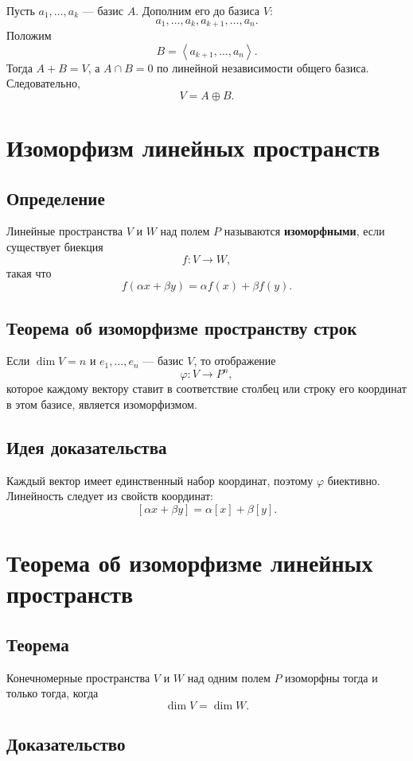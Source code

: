 \documentclass[12pt,a4paper]{article}
\newcommand{\Lin}[1]{\left\langle #1 \right\rangle}
\begin{document}
Пусть $a_1,\ldots,a_k$ --- базис $A$. Дополним его до базиса $V$:
\[
    a_1,\ldots,a_k,a_{k+1},\ldots,a_n.
\]
Положим
\[
    B=\Lin{a_{k+1},\ldots,a_n}.
\]
Тогда $A+B=V$, а $A\cap B=0$ по линейной независимости общего базиса. Следовательно,
\[
    V=A\oplus B.
\]

\section{Изоморфизм линейных пространств}

\subsection*{Определение}

Линейные пространства $V$ и $W$ над полем $P$ называются \textbf{изоморфными}, если существует биекция
\[
    f:V\to W,
\]
такая что
\[
    f(\alpha x+\beta y)=\alpha f(x)+\beta f(y).
\]

\subsection*{Теорема об изоморфизме пространству строк}

Если $\dim V=n$ и $e_1,\ldots,e_n$ --- базис $V$, то отображение
\[
    \varphi:V\to P^n,
\]
которое каждому вектору ставит в соответствие столбец или строку его координат в этом базисе, является изоморфизмом.

\subsection*{Идея доказательства}

Каждый вектор имеет единственный набор координат, поэтому $\varphi$ биективно. Линейность следует из свойств координат:
\[
    [\alpha x+\beta y]=\alpha[x]+\beta[y].
\]

\section{Теорема об изоморфизме линейных пространств}

\subsection*{Теорема}

Конечномерные пространства $V$ и $W$ над одним полем $P$ изоморфны тогда и только тогда, когда
\[
    \dim V=\dim W.
\]

\subsection*{Доказательство}
\end{document}
